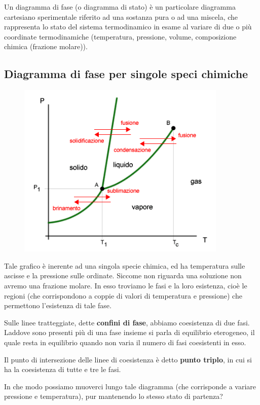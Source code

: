 Un diagramma di fase (o diagramma di stato) è un particolare diagramma cartesiano sperimentale riferito ad una sostanza pura o ad una miscela, che rappresenta lo stato del sistema termodinamico in esame al variare di due o più coordinate termodinamiche (temperatura, pressione, volume, composizione chimica (frazione molare)).

\subsection{Diagramma di fase per singole speci chimiche}

\begin{figure}[htp]
    \centering
    \includegraphics[width=10cm]{immagini/diagramma_di_stato.png}
\end{figure}

Tale grafico è inerente ad una singola specie chimica, ed ha temperatura sulle ascisse e la pressione sulle ordinate. Siccome non riguarda una soluzione non avremo una frazione molare. In esso troviamo le fasi e la loro esistenza, cioè le regioni (che corrispondono a coppie di valori di temperatura e pressione) che permettono l'esistenza di tale fase.

Sulle linee tratteggiate, dette \textbf{confini di fase}, abbiamo coesistenza di due fasi. Laddove sono presenti più di una fase insieme si parla di equilibrio eterogeneo, il quale resta in equilibrio quando non varia il numero di fasi coesistenti in esso.

Il punto di intersezione delle linee di coesistenza è detto \textbf{punto triplo}, in cui si ha la coesistenza di tutte e tre le fasi.

In che modo possiamo muoverci lungo tale diagramma (che corrisponde a variare pressione e temperatura), pur mantenendo lo stesso stato di partenza?

